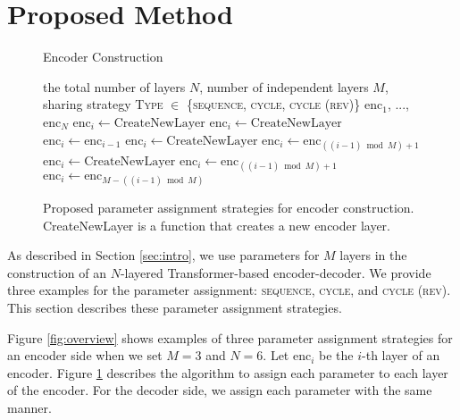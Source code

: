 \documentclass[11pt]{article}
\begin{document}
\section{Proposed Method}
\begin{figure}[!t]
  \begin{algorithm}[H]
\caption{Encoder Construction}
  \begin{algorithmic}[1]
   \renewcommand{\algorithmicrequire}{\textbf{Input:}}
   \renewcommand{\algorithmicensure}{\textbf{Output:}}
   \Require the total number of layers $N$, number of independent layers $M$, sharing strategy \textsc{Type} $\in$ \{\textsc{sequence, cycle, cycle (rev)}\}
   \Ensure $\textrm{enc}_1$, ..., $\textrm{enc}_N$
     \State $\textrm{enc}_i \gets \textrm{CreateNewLayer}$
       \State $\textrm{enc}_i \gets \textrm{CreateNewLayer}$
       \Else
       \State $\textrm{enc}_i \gets \textrm{enc}_{i-1}$
       \EndIf
       \State $\textrm{enc}_i \gets \textrm{CreateNewLayer}$
       \Else
       \State $\textrm{enc}_i \gets \textrm{enc}_{((i - 1) \bmod M) + 1}$
       \EndIf
       \State $\textrm{enc}_i \gets \textrm{CreateNewLayer}$
       \State $\textrm{enc}_i \gets \textrm{enc}_{((i - 1) \bmod M) + 1}$
       \Else
       \State $\textrm{enc}_i \gets \textrm{enc}_{M - ((i - 1) \bmod M)}$       
       \EndIf
     \EndIf
   \EndFor
\end{algorithmic}
  \end{algorithm}
  \caption{Proposed parameter assignment strategies for encoder construction. CreateNewLayer is a function that creates a new encoder layer.}
  \label{fig:enc_construction}
\end{figure}

As described in Section \ref{sec:intro}, we use parameters for $M$ layers in the construction of an $N$-layered Transformer-based encoder-decoder.
We provide three examples for the parameter assignment: \textsc{sequence}, \textsc{cycle}, and \textsc{cycle (rev)}.
This section describes these parameter assignment strategies.

Figure \ref{fig:overview} shows examples of three parameter assignment strategies for an encoder side when we set $M=3$ and $N=6$.
Let $\textrm{enc}_i$ be the $i$-th layer of an encoder.
Figure \ref{fig:enc_construction} describes the algorithm to assign each parameter to each layer of the encoder.
For the decoder side, we assign each parameter with the same manner.
\end{document}
